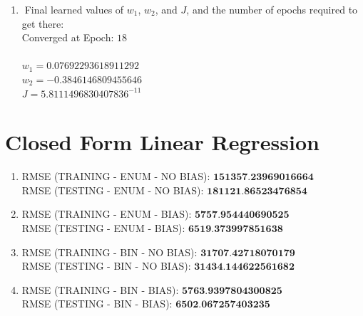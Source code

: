 \documentclass[12pt]{article}
\begin{document}
\begin{enumerate}
		\newpage
		
		\item Final learned values of $w_1$, $w_2$, and $J$, and the number of epochs required to get there:\\
		
		Converged at Epoch:  $18$\\\\
		$w_1 = 0.07692293618911292$\\ 
		$w_2 = -0.3846146809455646$\\
		$J = 5.8111496830407836^{-11}$
		
	\end{enumerate}
	


\section{Closed Form Linear Regression}

	\begin{enumerate}
		

		\item 
		RMSE (TRAINING - ENUM - NO BIAS):  $\textbf{151357.23969016664}$\\
		RMSE (TESTING - ENUM - NO BIAS):  $\textbf{181121.86523476854}$\\
		
		\item
		RMSE (TRAINING - ENUM - BIAS):  $\textbf{5757.954440690525}$\\
		RMSE (TESTING - ENUM - BIAS):  $\textbf{6519.373997851638}$\\
		
		\item
		RMSE (TRAINING - BIN - NO BIAS):  $\textbf{31707.42718070179}$\\
		RMSE (TESTING - BIN - NO BIAS):  $\textbf{31434.144622561682}$\\
		
		\item
		RMSE (TRAINING - BIN - BIAS):  $\textbf{5763.9397804300825}$\\
		RMSE (TESTING - BIN - BIAS):  $\textbf{6502.067257403235}$\\


	\end{enumerate}
\end{document}
